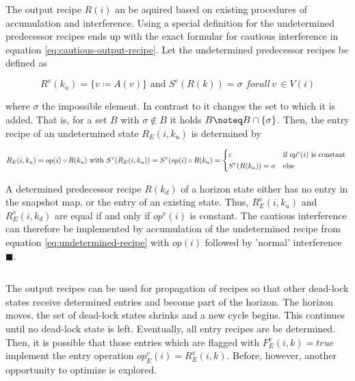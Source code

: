 \documentclass[12pt,a4paper]{scrartcl}
\begin{document}
The output recipe $R(i)$ an be aquired based on existing procedures of
accumulation and interference. Using a special definition for the undetermined
predecessor recipes ends up with the exact formular for cautious interference
in equation \ref{eq:cautious-output-recipe}. Let the undetermined
predecessor recipes be defined as

\begin{equation} \label{eq:undetermined-recipe}
    R^v(k_u) = \{ v \coloneqq A(v) \} \,\,\mbox{and}\,\, S^v(R(k)) = \sigma\,\,forall\,v\,\in V(i)
\end{equation}

where $\sigma$ the impossible element. In contrast to \varepsilon it changes
the set to which it is added. That is, for a set $B$ with $\sigma \notin B$ it
holds $B \noteq B \cap \{ \sigma \}$.  Then, the entry recipe of an undetermined
state $R_E(i,k_u)$ is determined by

\begin{equation}
    R_E(i,k_u) = op(i) \circ R(k_u)
    \,\,\mbox{with}\,\, 
    S^v(R_E(i,k_u)) = S^v(op(i) \circ R(k_u)  
                    = \begin{dcases*}
                       \varepsilon           & if $op^v(i)$ is constant \\
                        S^v(R(k_u)) = \sigma & else
                      \end{dcases*}
\end{equation}

A determined predecessor recipe $R(k_d)$ of a horizon state either has no entry
in the snapshot map, or the entry of an existing state. Thus, $R^v_E(i,k_u)$
and $R^v_E(i,k_d)$ are equal if and only if $op^v(i)$ is constant. The cautious
interference can therefore be implemented by accumulation of the undetermined
recipe from equation \eqref{eq:undetermined-recipe} with $op(i)$ followed by 
'normal' interference $\blacksquare$.

\begin{equation}
\end{equation}

The output recipes can be used for propagation of recipes so that other
dead-lock states receive determined entries and become part of the horizon.
The horizon moves, the set of dead-lock states shrinks and a new cycle begins.
This continues until no dead-lock state is left.  Eventually, all entry recipes
are be determined. Then, it is possible that those entries which are flagged
with $F_E^v(i,k)=true$ implement the entry operation $op_E^v(i)=R_E^v(i,k)$.
Before, however, another opportunity to optimize is explored. 
\end{document}
